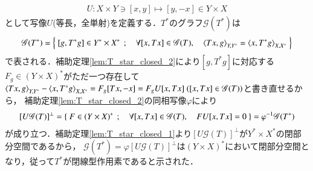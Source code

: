 	\begin{prf}
		\begin{align}
			U : X \times Y \ni [x,y] \longmapsto [y,-x] \in Y \times X
		\end{align}
		として写像$U$(等長，全単射)を定義する．$T^*$のグラフ$\mathscr{G}(T^*)$は
		\begin{align}
			\mathscr{G}(T^*) = \Set{[g,T^*g] \in Y^* \times X^*}{\forall [x,Tx] \in \mathscr{G}(T),\quad \inprod<Tx,g>_{Y,Y^*} = \inprod<x,T^*g>_{X,X^*}}
		\end{align}
		で表される．補助定理\ref{lem:T_star_closed_2}により$[g,T^*g]$に対応する$F_g \in (Y \times X)^*$がただ一つ存在して
		$\inprod<Tx,g>_{Y,Y^*} - \inprod<x,T^*g>_{X,X^*} = F_g[Tx,-x] = F_gU[x,Tx]\ ([x,Tx] \in \mathscr{G}(T))$と書き直せるから，
		補助定理\ref{lem:T_star_closed_2}の同相写像$\varphi$により
		\begin{align}
			\left[U\mathscr{G}(T) \right]^{\perp} = \left\{\ F \in (Y \times X)^*\ \, ; \quad \forall [x,Tx] \in \mathscr{G}(T),\quad FU[x,Tx] = 0\ \right\}
			= \varphi^{-1}\mathscr{G}(T^*)
		\end{align}
		が成り立つ．補助定理\ref{lem:T_star_closed_1}より$\left[U\mathscr{G}(T) \right]^{\perp}$が$Y^* \times X^*$の閉部分空間であるから，
		$\mathscr{G}(T^*) = \varphi \left[U\mathscr{G}(T) \right]^{\perp}$は$(Y \times X)^*$において閉部分空間となり，従って$T^*$が閉線型作用素であると示された．
		\QED
	\end{prf}
	